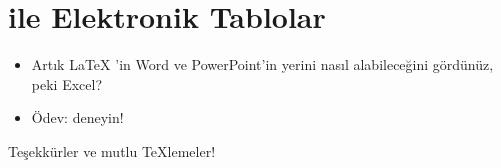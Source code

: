 \documentclass[aspectratio=169]{beamer}
\begin{document}
\section{\protect{} ile Elektronik Tablolar}

\begin{frame}[fragile]{\insertsection}
\begin{itemize}
\item Artık \LaTeX{} 'in Word ve PowerPoint'in yerini nasıl alabileceğini gördünüz, peki Excel?
\item Ödev:  deneyin!
\end{itemize}
\end{frame}

\begin{frame}
\begin{center}
Teşekkürler ve mutlu \TeX{}lemeler!
\end{center}
\end{frame}
\end{document}
